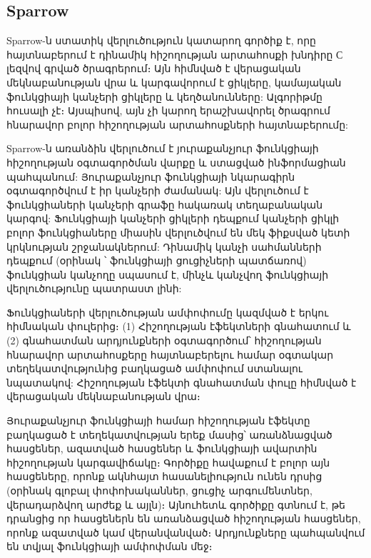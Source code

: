 \subsection{Sparrow}
Sparrow\cite{Jung2008}-ն ստատիկ վերլուծություն կատարող գործիք է, որը հայտնաբերում է դինամիկ հիշողության արտահոսքի խնդիրը
С լեզվով գրված ծրագրերում։ Այն հիմնված է վերացական մեկնաբանության վրա և կարգավորում է ցիկլերը, կամայական ֆունկցիայի
կանչերի ցիկլերը և կեղծանունները: Ալգորիթմը հուսալի չէ։ Այսպիսով, այն չի կարող երաշխավորել ծրագրում հնարավոր բոլոր
հիշողության արտահոսքների հայտնաբերումը:

Sparrow-ն առանձին վերլուծում է յուրաքանչյուր ֆունկցիայի հիշողության օգտագործման վարքը և ստացված ինֆորմացիան պահպանում:
Յուրաքանչյուր ֆունկցիայի նկարագիրն օգտագործվում է իր կանչերի ժամանակ: Այն վերլուծում է ֆունկցիաների կանչերի գրաֆը հակառակ
տեղաբանական կարգով: Ֆունկցիայի կանչերի ցիկլերի դեպքում կանչերի ցիկլի բոլոր ֆունկցիաները միասին վերլուծվում են մեկ ֆիքսված
կետի կրկնության շրջանակներում: Դինամիկ կանչի սահմանների դեպքում (օրինակ ՝ ֆունկցիայի ցուցիչների պատճառով) ֆունկցիան
կանչողը սպասում է, մինչև կանչվող ֆունկցիայի վերլուծությունը պատրաստ լինի:

Ֆունկցիաների վերլուծության ամփոփումը կազմված է երկու հիմնական փուլերից։ (1) Հիշողության էֆեկտների գնահատում և (2)
գնահատման արդյունքների օգտագործում՝ հիշողության հնարավոր արտահոսքերը հայտնաբերելու համար օգտակար տեղեկատվությունից
բաղկացած ամփոփում ստանալու նպատակով: Հիշողության էֆեկտի գնահատման փուլը հիմնված է վերացական մեկնաբանության վրա։

Յուրաքանչյուր ֆունկցիայի համար հիշողության էֆեկտը բաղկացած է տեղեկատվության երեք մասից՝ առանձնացված հասցեներ, ազատված
հասցեներ և ֆունկցիայի ավարտին հիշողության կարգավիճակը։ Գործիքը հավաքում է բոլոր այն հասցեները, որոնք ակնհայտ
հասանելիություն ունեն դրսից (օրինակ գլոբալ փոփոխականներ, ցուցիչ արգումենտներ, վերադարձվող արժեք և այլն)։ Այնուհետև
գործիքը գտնում է, թե դրանցից որ հասցեներն են առանձացված հիշողության հասցեներ, որոնք ազատված կամ վերանվանված։ Արդյունքները
պահպանվում են տվյալ ֆունկցիայի ամփոփման մեջ։

